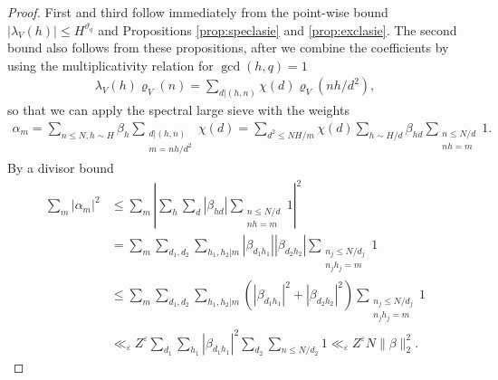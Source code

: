 \documentclass[12pt]{amsart}
\theoremstyle{definition}
\theoremstyle{remark}
\numberwithin{equation}{section}
\newcommand{\1}{{\mathbf 1}}
\newcommand{\eps}{\varepsilon}
\newcommand{\m}{\mathfrak{m}}
\begin{document}
\begin{proof}
First and third follow immediately from the point-wise bound  $|\lambda_V(h)| \leq H^{\vartheta_q}$ and Propositions \ref{prop:speclasie} and \ref{prop:exclasie}. The second bound also follows from these propositions, after we combine the coefficients by using the multiplicativity relation for $\gcd(h,q)=1$
    \begin{align*}
        \lambda_V(h)\varrho_V(n) = \sum_{d|(h,n)} \chi(d)  \varrho_V(nh/d^2),
    \end{align*}
    so that we can apply the spectral large sieve with the weights
\begin{align*}
    \alpha_m=\sum_{n\leq N, h\sim H}\beta_h \sum_{\substack{d|(h,n)\\m=nh/d^2}}\chi(d)=\sum_{d^2\leq NH/m}\chi(d) \sum_{h\sim H/d}\beta_{hd} \sum_{\substack{n\leq N/d\\ nh=m}}1.
\end{align*}
By a divisor bound
\begin{align*}
    \sum_{m}| \alpha_m|^2&\leq \sum_{m}\left|\sum_{h}\sum_{d}|\beta_{hd}|\sum_{\substack{n\leq N/d\\ nh=m}} 1 \right|^2 \\
  &= \sum_{m}  \sum_{d_1,d_2}\sum_{h_1,h_2 | m} |\beta_{d_1 h_1}| |\beta_{d_2 h_2}|  \sum_{\substack{n_j\leq N/d_j\\ n_jh_j=m}}1 \\
   &\leq \sum_{m}  \sum_{d_1,d_2}\sum_{h_1,h_2 | m} (|\beta_{d_1 h_1}|^2 +|\beta_{d_2 h_2}|^2)   \sum_{\substack{n_j\leq N/d_j\\ n_jh_j=m}} 1  \\
  & \ll_\eps Z^\eps  \sum_{d_1} \sum_{h_1} |\beta_{d_1 h_1}|^2 \sum_{d_2} \sum_{n \leq  N/d_2}  1  \ll_\eps Z^{\eps} N \|\beta\|_2^2.
 \end{align*}
\end{proof}
\end{document}
